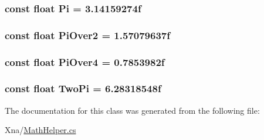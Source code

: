 \subsubsection[{Pi}]{\setlength{\rightskip}{0pt plus 5cm}const float Pi = 3.\+14159274f}\label{classMicrosoft_1_1Xna_1_1Framework_1_1MathHelper_a26722c3df2ea3f0f62eef1a57cf05016}
\hypertarget{classMicrosoft_1_1Xna_1_1Framework_1_1MathHelper_a49586d2f5d3d4a19514c8ca66c181f10}{}
\subsubsection[{Pi\+Over2}]{\setlength{\rightskip}{0pt plus 5cm}const float Pi\+Over2 = 1.\+57079637f}\label{classMicrosoft_1_1Xna_1_1Framework_1_1MathHelper_a49586d2f5d3d4a19514c8ca66c181f10}
\hypertarget{classMicrosoft_1_1Xna_1_1Framework_1_1MathHelper_a29dad6a672f0dd56bdefbe9e1063fa61}{}
\subsubsection[{Pi\+Over4}]{\setlength{\rightskip}{0pt plus 5cm}const float Pi\+Over4 = 0.\+7853982f}\label{classMicrosoft_1_1Xna_1_1Framework_1_1MathHelper_a29dad6a672f0dd56bdefbe9e1063fa61}
\hypertarget{classMicrosoft_1_1Xna_1_1Framework_1_1MathHelper_a8905fde37d88e7ddd4eb71eae6de7d21}{}
\subsubsection[{Two\+Pi}]{\setlength{\rightskip}{0pt plus 5cm}const float Two\+Pi = 6.\+28318548f}\label{classMicrosoft_1_1Xna_1_1Framework_1_1MathHelper_a8905fde37d88e7ddd4eb71eae6de7d21}


The documentation for this class was generated from the following file\+:\begin{DoxyCompactItemize}
\item 
Xna/\hyperlink{MathHelper_8cs}{Math\+Helper.\+cs}\end{DoxyCompactItemize}
